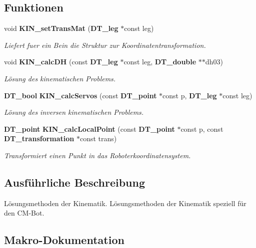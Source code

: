 \subsection*{Funktionen}
\begin{DoxyCompactItemize}
\item 
void {\bf KIN\_\-setTransMat} ({\bf DT\_\-leg} $\ast$const leg)
\begin{DoxyCompactList}\small\item\em Liefert fuer ein Bein die Struktur zur Koordinatentransformation. \item\end{DoxyCompactList}\item 
void {\bf KIN\_\-calcDH} (const {\bf DT\_\-leg} $\ast$const leg, {\bf DT\_\-double} $\ast$$\ast$dh03)
\begin{DoxyCompactList}\small\item\em Lösung des kinematischen Problems. \item\end{DoxyCompactList}\item 
{\bf DT\_\-bool} {\bf KIN\_\-calcServos} (const {\bf DT\_\-point} $\ast$const p, {\bf DT\_\-leg} $\ast$const leg)
\begin{DoxyCompactList}\small\item\em Lösung des inversen kinematischen Problems. \item\end{DoxyCompactList}\item 
{\bf DT\_\-point} {\bf KIN\_\-calcLocalPoint} (const {\bf DT\_\-point} $\ast$const p, const {\bf DT\_\-transformation} $\ast$const trans)
\begin{DoxyCompactList}\small\item\em Transformiert einen Punkt in das Roboterkoordinatensystem. \item\end{DoxyCompactList}\end{DoxyCompactItemize}


\subsection{Ausführliche Beschreibung}
Lösungsmethoden der Kinematik. Lösungsmethoden der Kinematik speziell für den CM-\/Bot. 

\subsection{Makro-\/Dokumentation}
